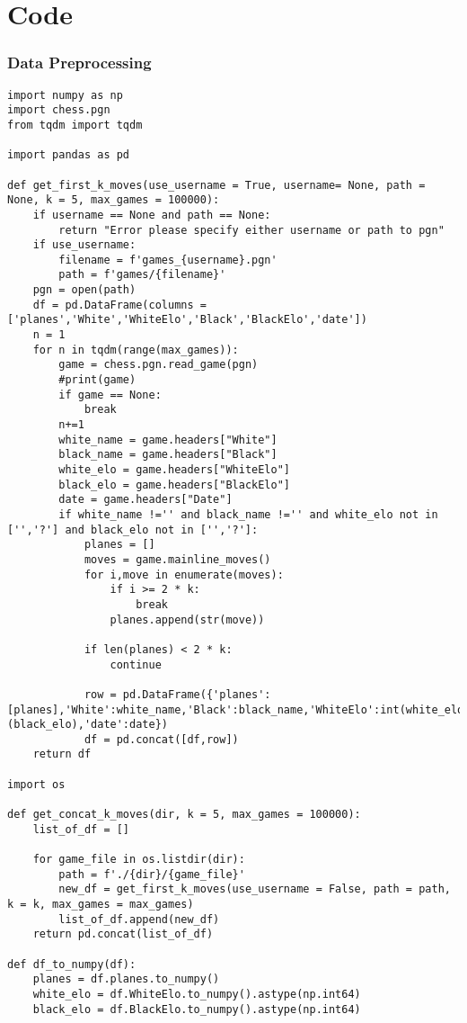 \section*{Code}
\subsubsection{Data Preprocessing}
\begin{verbatim}
import numpy as np
import chess.pgn
from tqdm import tqdm

import pandas as pd

def get_first_k_moves(use_username = True, username= None, path = None, k = 5, max_games = 100000):
    if username == None and path == None:
        return "Error please specify either username or path to pgn"
    if use_username:
        filename = f'games_{username}.pgn'
        path = f'games/{filename}'
    pgn = open(path)
    df = pd.DataFrame(columns = ['planes','White','WhiteElo','Black','BlackElo','date'])
    n = 1
    for n in tqdm(range(max_games)):
        game = chess.pgn.read_game(pgn)
        #print(game)
        if game == None:
            break
        n+=1
        white_name = game.headers["White"]
        black_name = game.headers["Black"]
        white_elo = game.headers["WhiteElo"]
        black_elo = game.headers["BlackElo"]
        date = game.headers["Date"]
        if white_name !='' and black_name !='' and white_elo not in ['','?'] and black_elo not in ['','?']:
            planes = []
            moves = game.mainline_moves()
            for i,move in enumerate(moves):
                if i >= 2 * k:
                    break
                planes.append(str(move))

            if len(planes) < 2 * k:
                continue

            row = pd.DataFrame({'planes':[planes],'White':white_name,'Black':black_name,'WhiteElo':int(white_elo),'BlackElo':(black_elo),'date':date})
            df = pd.concat([df,row])
    return df

import os

def get_concat_k_moves(dir, k = 5, max_games = 100000):
    list_of_df = []

    for game_file in os.listdir(dir):
        path = f'./{dir}/{game_file}'
        new_df = get_first_k_moves(use_username = False, path = path, k = k, max_games = max_games)
        list_of_df.append(new_df)
    return pd.concat(list_of_df)

def df_to_numpy(df):
    planes = df.planes.to_numpy()
    white_elo = df.WhiteElo.to_numpy().astype(np.int64)
    black_elo = df.BlackElo.to_numpy().astype(np.int64)


\end{verbatim}
